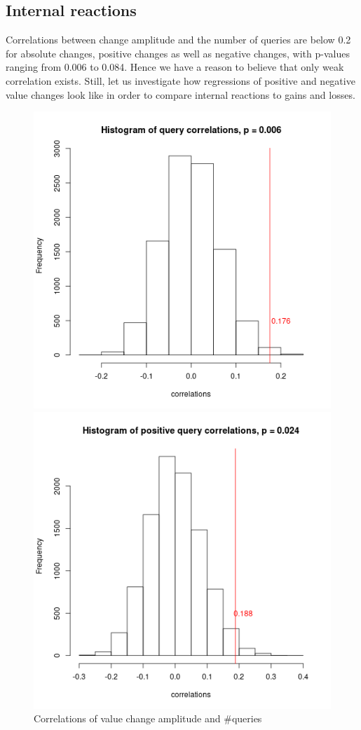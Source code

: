 \documentclass[12pt]{article}
\begin{document}
\subsection{Internal reactions}
Correlations between change amplitude and the number of queries are below 0.2 for absolute changes, positive changes as well as negative changes, with p-values ranging from 0.006 to 0.084. Hence we have a reason to believe that only weak correlation exists. Still, let us investigate how regressions of positive and negative value changes look like in order to compare internal reactions to gains and losses.
\begin{figure}[!htb]
  \includegraphics[width=\linewidth]{queryCorrelations.png}
  \caption{Correlations of value change amplitude and \#queries}\label{fig:trendCorrelation}
\endminipage\hfill
{}
  \includegraphics[width=\linewidth]{positiveQueryCorrelations.png}

\end{figure}
\end{document}
